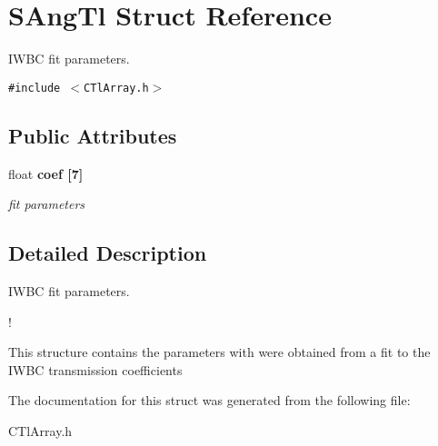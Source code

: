 \section{SAng\-Tl Struct Reference}
\label{structSAngTl}
IWBC fit parameters.  


{\tt \#include $<$CTl\-Array.h$>$}

\subsection*{Public Attributes}
\begin{CompactItemize}
\item 
float \bf{coef} [7]\label{structSAngTl_bc0f57ed3863a2494df8b63b298136c5}

\begin{CompactList}\small\item\em fit parameters \item\end{CompactList}\end{CompactItemize}


\subsection{Detailed Description}
IWBC fit parameters. 

!

This structure contains the parameters with were obtained from a fit to the IWBC transmission coefficients 



The documentation for this struct was generated from the following file:\begin{CompactItemize}
\item 
CTl\-Array.h\end{CompactItemize}
